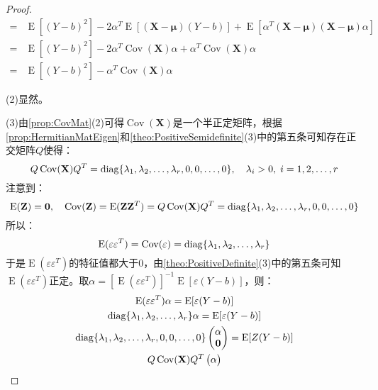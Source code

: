 \begin{proof}
\begin{align*}
		=&\operatorname{E}[(Y-b)^2]-2\alpha^T\operatorname{E}[(\mathbf{X}-\boldsymbol{\mu})(Y-b)]+\operatorname{E}[\alpha^T(\mathbf{X}-\boldsymbol{\mu})(\mathbf{X}-\boldsymbol{\mu})\alpha] \\
		=&\operatorname{E}[(Y-b)^2]-2\alpha^T\operatorname{Cov}(\mathbf{X})\alpha+\alpha^T\operatorname{Cov}(\mathbf{X})\alpha \\
		=&\operatorname{E}[(Y-b)^2]-\alpha^T\operatorname{Cov}(\mathbf{X})\alpha
	\end{align*}\par
	(2)显然。\par
	(3)由\cref{prop:CovMat}(2)可得$\operatorname{Cov}(\mathbf{X})$是一个半正定矩阵，根据\cref{prop:HermitianMatEigen}和\cref{theo:PositiveSemidefinite}(3)中的第五条可知存在正交矩阵$Q$使得：
	\begin{equation*}
		Q\operatorname{Cov}(\mathbf{X})Q^T=\operatorname{diag}\{\lambda_1, \lambda_2, \dots, \lambda_{r},0,0,\dots,0\},\quad\lambda_i>0,\;i=1,2,\dots,r
	\end{equation*}
	注意到：
	\begin{equation*}
		\operatorname{E}(\mathbf{Z})=\mathbf{0},\quad\operatorname{Cov}(\mathbf{Z})=\operatorname{E}(\mathbf{Z}\mathbf{Z}^T)=Q\operatorname{Cov}(\mathbf{X})Q^T=\operatorname{diag}\{\lambda_1, \lambda_2, \dots, \lambda_{r},0,0,\dots,0\}
	\end{equation*}
	所以：
	\begin{equation*}
		\operatorname{E}(\varepsilon\varepsilon^T)=\operatorname{Cov}(\varepsilon)=\operatorname{diag}\{\lambda_1, \lambda_2, \dots, \lambda_{r}\}
	\end{equation*}
	于是$\operatorname{E}(\varepsilon\varepsilon^T)$的特征值都大于$0$，由\cref{theo:PositiveDefinite}(3)中的第五条可知$\operatorname{E}(\varepsilon\varepsilon^T)$正定。取$\alpha=[\operatorname{E}(\varepsilon\varepsilon^T)]^{-1}\operatorname{E}[\varepsilon(Y-b)]$，则：
	\begin{gather*}
		\operatorname{E}(\varepsilon\varepsilon^T)\alpha=\operatorname{E}[\varepsilon(Y-b)] \\
		\operatorname{diag}\{\lambda_1, \lambda_2, \dots, \lambda_{r}\}\alpha=\operatorname{E}[\varepsilon(Y-b)] \\
		\operatorname{diag}\{\lambda_1, \lambda_2, \dots, \lambda_{r},0,0,\dots,0\}
		\begin{pmatrix}
			\alpha \\
			\mathbf{0}	
		\end{pmatrix}=\operatorname{E}[Z(Y-b)] \\
		Q\operatorname{Cov}(\mathbf{X})Q^T
		\begin{pmatrix}
			\alpha \\

\end{pmatrix}
\end{gather*}
\end{proof}
